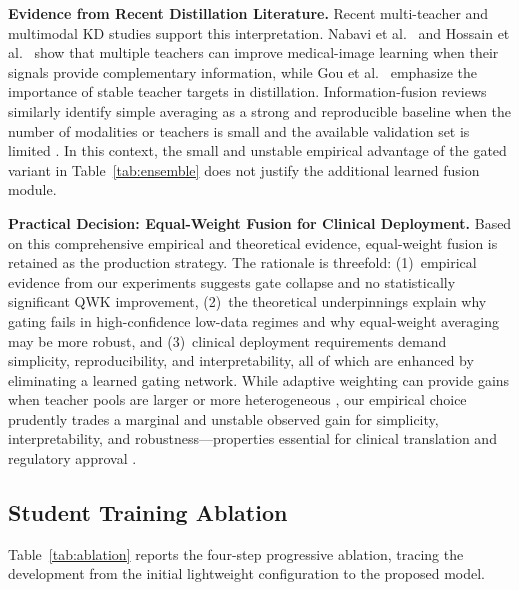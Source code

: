 \documentclass[a4paper,fleqn]{cas-dc}
\begin{document}
\textbf{Evidence from Recent Distillation Literature.} Recent multi-teacher and multimodal KD studies support this interpretation. Nabavi et al.\ \cite{nabavi2024} and Hossain et al.\ \cite{hossain2025} show that multiple teachers can improve medical-image learning when their signals provide complementary information, while Gou et al.\ \cite{gou2021} emphasize the importance of stable teacher targets in distillation. Information-fusion reviews similarly identify simple averaging as a strong and reproducible baseline when the number of modalities or teachers is small and the available validation set is limited \cite{li2024}. In this context, the small and unstable empirical advantage of the gated variant in Table~\ref{tab:ensemble} does not justify the additional learned fusion module.

\textbf{Practical Decision: Equal-Weight Fusion for Clinical Deployment.} Based on this comprehensive empirical and theoretical evidence, equal-weight fusion is retained as the production strategy. The rationale is threefold: (1)~empirical evidence from our experiments suggests gate collapse and no statistically significant QWK improvement, (2)~the theoretical underpinnings explain why gating fails in high-confidence low-data regimes and why equal-weight averaging may be more robust, and (3)~clinical deployment requirements demand simplicity, reproducibility, and interpretability, all of which are enhanced by eliminating a learned gating network. While adaptive weighting can provide gains when teacher pools are larger or more heterogeneous \cite{islam2023,yilmaz2025,alshafi2024}, our empirical choice prudently trades a marginal and unstable observed gain for simplicity, interpretability, and robustness---properties essential for clinical translation and regulatory approval \cite{gou2021,miyato2018}.


\FloatBarrier

\subsection{Student Training Ablation}
\label{sec:ablation}

Table~\ref{tab:ablation} reports the four-step progressive ablation, tracing the development from the initial lightweight configuration to the proposed model.
\end{document}
